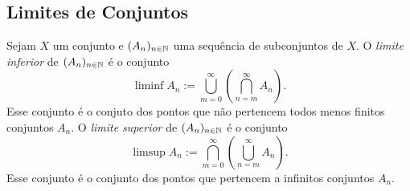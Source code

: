 

\subsection{Limites de Conjuntos}

\begin{defi}
	Sejam $X$ um conjunto e $(A_n)_{n \in \mathbb{N}}$ uma sequência de subconjuntos de $X$. O \emph{limite inferior} de $(A_n)_{n \in \mathbb{N}}$ é o conjunto
	\begin{equation*}
	\liminf A_n := \bigcup_{m=0}^\infty \left( \bigcap_{n=m}^\infty A_n \right).
	\end{equation*}
	Esse conjunto é o conjuto dos pontos que não pertencem todos menos finitos conjuntos $A_n$.
O \emph{limite superior} de $(A_n)_{n \in \mathbb{N}}$ é o conjunto
	\begin{equation*}
	\limsup A_n := \bigcap_{m=0}^\infty \left( \bigcup_{n=m}^\infty A_n \right).
	\end{equation*}
	Esse conjunto é o conjunto dos pontos que pertencem a infinitos conjuntos $A_n$.
\end{defi}

